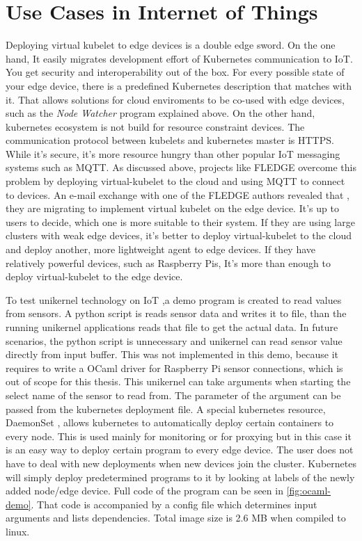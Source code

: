\section{Use Cases in Internet of Things}

Deploying virtual kubelet to edge devices is a double edge sword. On the one hand, It easily migrates development effort of Kubernetes communication to IoT. You get security and interoperability out of the box. For every possible state of your edge device, there is a predefined Kubernetes description that matches with it. That allows solutions for cloud enviroments to be co-used with edge devices, such as the \textit{Node Watcher} program explained above. On the other hand, kubernetes ecosystem is not build for resource constraint devices. The communication protocol between kubelets and kubernetes master is HTTPS. While it's secure, it's more resource hungry than other popular IoT messaging systems such as MQTT. As discussed above, projects like FLEDGE overcome this problem by deploying virtual-kubelet to the cloud and using MQTT to connect to devices. An e-mail exchange with one of the FLEDGE authors revealed that , they are migrating to implement virtual kubelet on the edge device. It's up to users to decide, which one is more suitable to their system. If they are using large clusters with weak edge devices, it's better to deploy virtual-kubelet to the cloud and deploy another, more lightweight agent to edge devices. If they have relatively powerful devices, such as Raspberry Pis, It's more than enough to deploy virtual-kubelet to the edge device.

To test unikernel technology on IoT ,a demo program is created to read values from sensors. A python script is reads sensor data and writes it to file, than the running unikernel applications reads that file to get the actual data. In future scenarios, the python script is unnecessary and unikernel can read sensor value directly from input buffer. This was not implemented in this demo, because it requires to write a OCaml driver for Raspberry Pi sensor connections, which is out of scope for this thesis. This unikernel can take arguments when starting the select name of the sensor to read from. The parameter of the argument can be passed from the kubernetes deployment file. A special kubernetes resource, DaemonSet , allows kubernetes to automatically deploy certain containers to every node. This is used mainly for monitoring or for proxying but in this case it is an easy way to deploy certain program to every edge device. The user does not have to deal with new deployments when new devices join the cluster. Kubernetes will simply deploy predetermined programs to it by looking at labels of the newly added node/edge device. Full code of the program can be seen in \ref{fig:ocaml-demo}. That code is accompanied by a config file which determines input arguments and lists dependencies. Total image size is 2.6 MB when compiled to linux.

